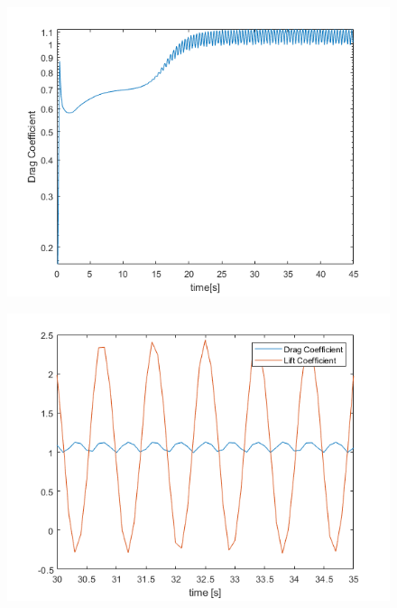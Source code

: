 \documentclass[12pt]{article}
\begin{document}
               \begin{figure}[!ht]
                \includegraphics[width=\textwidth]{drag_Federica.png}
                \centering
                \caption{}
                \label{fig:drag_f}
        \end{figure}
     
            \begin{figure}[!ht]
                \includegraphics[width=\textwidth]{drag_vs_lift_Federica.png}
                \centering
                \caption{}
                \label{fig:drag_vsl1}
        \end{figure}
     
\end{document}
